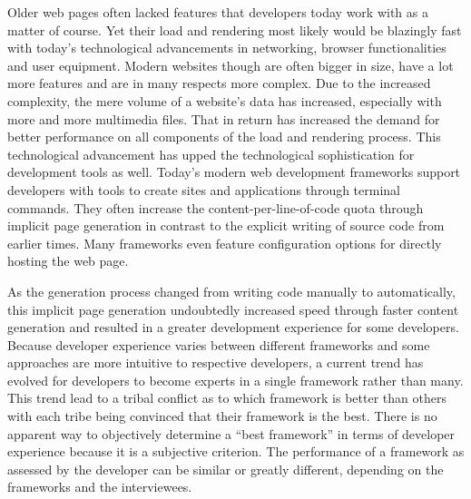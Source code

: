 \documentclass[a4paper, 12pt]{article}
\begin{document}
Older web pages often lacked features that developers today work with as a matter of course.
Yet their load and rendering most likely would be blazingly fast with today's technological advancements in networking, browser functionalities and user equipment.
Modern websites though are often bigger in size, have a lot more features and are in many respects more complex.
Due to the increased complexity, the mere volume of a website's data has increased, especially with more and more multimedia files.
That in return has increased the demand for better performance on all components of the load and rendering process.
This technological advancement has upped the technological sophistication for development tools as well.
Today's modern web development frameworks support developers with tools to create sites and applications through terminal commands.
They often increase the content-per-line-of-code quota through implicit page generation in contrast to the explicit writing of source code from earlier times.
Many frameworks even feature configuration options for directly hosting the web page.

As the generation process changed from writing code manually to automatically, this implicit page generation undoubtedly increased speed through faster content generation and resulted in a greater development experience for some developers.
Because developer experience varies between different frameworks and some approaches are more intuitive to respective developers, a current trend has evolved for developers to become experts in a single framework rather than many.
This trend lead to a tribal conflict as to which framework is better than others with each tribe being convinced that their framework is the best.
There is no apparent way to objectively determine a \enquote{best framework} in terms of developer experience because it is a subjective criterion.
The performance of a framework as assessed by the developer can be similar or greatly different, depending on the frameworks and the interviewees.
\end{document}

